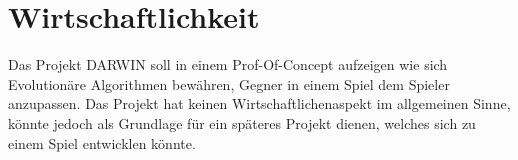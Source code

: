 \section{Wirtschaftlichkeit}
	Das Projekt DARWIN soll in einem Prof-Of-Concept aufzeigen wie sich Evolutionäre Algorithmen bewähren, Gegner in einem Spiel dem Spieler anzupassen. Das Projekt hat keinen Wirtschaftlichenaspekt im allgemeinen Sinne, könnte jedoch als Grundlage für ein späteres Projekt dienen, welches sich zu einem Spiel entwicklen könnte.